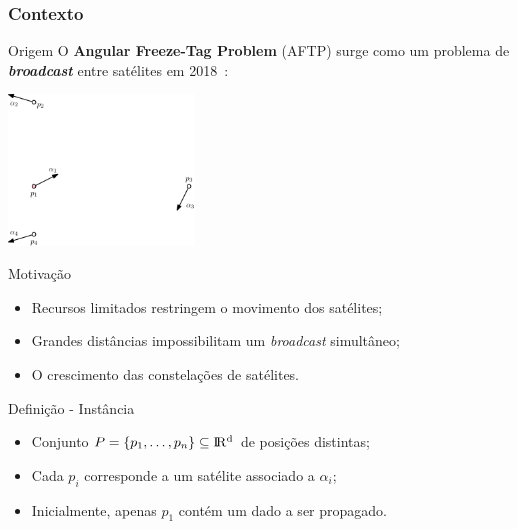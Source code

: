 
\subsubsection{Contexto}

\stopcounter
\begin{frame}{Origem}
  O \textbf{Angular Freeze-Tag Problem} (AFTP) surge como um problema de \textbf{\emph{broadcast}} entre satélites em 2018~\cite{Fe18}:
  \bigbreak
  \begin{minipage}{\linewidth}
    \centering
    \includegraphics[height=4cm]{AFTP/instance/Temp-0.png}
  \end{minipage}
\end{frame}
\inccounter

\begin{frame}{Motivação}
  \begin{itemize}[<+->]

    \item Recursos limitados restringem o movimento dos satélites;

    \item Grandes distâncias impossibilitam um \emph{broadcast} simultâneo;

    \item O crescimento das constelações de satélites.

  \end{itemize}
\end{frame}

\begin{frame}{Definição - Instância}
  \begin{itemize}[<+->]

    \item Conjunto $P = \{p_1, \dots, p_n\}\subseteq \rm I\!R^d$ de posições distintas;

    \item Cada $p_i$ corresponde a um satélite associado a $\alpha_i$;

    \item Inicialmente, apenas $p_1$ contém um dado a ser propagado.

  \end{itemize}
\end{frame}

